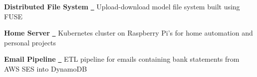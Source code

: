 \textbf{Distributed File System} \href{https://github.com/ininicho/watdfs}{\github\ }
Upload-download model file system built using FUSE \par
\textbf{Home Server} \href{https://github.com/ininicho/home-server}{\github\ }
Kubernetes cluster on Raspberry Pi's for home automation and personal projects \par
\textbf{Email Pipeline} \href{https://github.com/ininicho/personal-pipeline}{\github\ }
ETL pipeline for emails containing bank statements from AWS SES into DynamoDB \par

